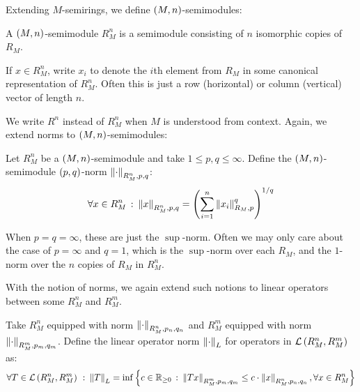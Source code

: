 Extending \(M\)-semirings,
we define \(\left(M, n\right)\)-semimodules:

\begin{definition}
  A \(\left(M, n\right)\)-semimodule \(R_M ^n\)
  is a semimodule consisting of \(n\) isomorphic copies of \(R_M\).
\end{definition}

If \(x \in R_M ^n\), write \(x_i\) to denote the \(i\)th element from
\(R_M\) in some canonical representation of \(R_M ^n\).
Often this is just a row (horizontal) or column (vertical)
vector of length \(n\).

We write \(R^n\) instead of \(R_M ^n\) when \(M\) is understood from context.
Again, we extend norms to \(\left(M, n\right)\)-semimodules:

\begin{definition}
  Let \(R_M ^n\) be a \(\left(M, n\right)\)-semimodule
  and take \(1 \leq p, q \leq \infty\).
  Define the \(\left(M, n\right)\)-semimodule \(\left(p, q\right)\)-norm
  \(\left\lVert\cdot\right\rVert_{R_M ^n, p, q}\):
  \begin{align*}
    \forall x \in R_M ^n \ \colon
      \left\lVert x\right\rVert_{R_M ^n, p, q}
        = \left(\sum_{i = 1}^{n} \left\lVert x_i\right\rVert_{R_M, p}^q\right)^{1 / q}
  \end{align*}
\end{definition}

When \(p = q = \infty\), these are just the \(\sup\)-norm.
Often we may only care about the case of \(p = \infty\) and \(q = 1\),
which is the \(\sup\)-norm over each \(R_M\),
and the \(1\)-norm over the \(n\) copies of \(R_M\) in \(R_M ^n\).

With the notion of norms, we again extend such notions to
linear operators between some \(R_M ^n\) and \(R_M ^m\).

\begin{definition}
  Take \(R_M ^n\) equipped with norm \(\left\lVert\cdot\right\rVert_{R_M ^n, p_n, q_n}\)
  and \(R_M ^m\) equipped with norm \(\left\lVert\cdot\right\rVert_{R_M ^m, p_m, q_m}\).
  Define the linear operator norm \(\left\lVert\cdot\right\rVert_L\)
  for operators in \(\mathcal{L}\left(R_M ^n, R_M ^m\right)\) as:
  \begin{align*}
    \forall T \in \mathcal{L}\left(R_M ^n, R_M ^m\right) \ \colon
      \left\lVert T\right\rVert_L =
        \inf \left\{c \in \mathbb{R}_{\geq 0} \ \colon
                \left\lVert Tx\right\rVert_{R_M ^m, p_m, q_m}
                  \leq c \cdot \left\lVert x\right\rVert_{R_M ^n, p_n, q_n},
                \forall x \in R_M ^n\right\}
  \end{align*}
\end{definition}


